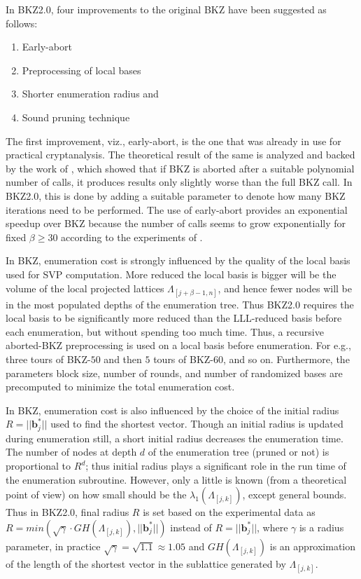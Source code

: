 In BKZ2.0, four improvements to the original BKZ have been suggested as follows:
\begin{enumerate}
    \item Early-abort
    \item Preprocessing of local bases
    \item Shorter enumeration radius and
    \item Sound pruning technique
\end{enumerate}

The first improvement, viz., early-abort, is the one that was already in use for practical cryptanalysis.
The theoretical result of the same is analyzed and backed by the work of \cite{hanrot2011analyzing}, which showed that if BKZ is aborted after a suitable polynomial number of calls, it produces results only slightly worse than the full BKZ call.
In BKZ2.0, this is done by adding a suitable parameter to denote how many BKZ iterations need to be performed.
The use of early-abort provides an exponential speedup over BKZ because the number of calls seems to grow exponentially for fixed $\beta \geq 30$ according to the experiments of \cite{gama2008predicting}.

In BKZ, enumeration cost is strongly inﬂuenced by the quality of the local basis used for SVP computation.
More reduced the local basis is bigger will be the volume of the local projected lattices $\Lambda_{[j+\beta-1,n]}$, and hence fewer nodes will be in the most populated depths of the enumeration tree.
Thus BKZ2.0 requires the local basis to be significantly more reduced than the LLL-reduced basis before each enumeration, but without spending too much time.
Thus, a recursive aborted-BKZ preprocessing is used on a local basis before enumeration.
For e.g., three tours of BKZ-$50$ and then $5$ tours of BKZ-$60$, and so on.
Furthermore, the parameters block size, number of rounds, and number of randomized bases are precomputed to minimize the total enumeration cost.


In BKZ, enumeration cost is also inﬂuenced by the choice of the initial radius $R=||\pmb{b}^*_j||$ used to find the shortest vector.
Though an initial radius is updated during enumeration still, a short initial radius decreases the enumeration time.
The number of nodes at depth $d$ of the enumeration tree (pruned or not) is proportional to $R^d$; thus initial radius plays a significant role in the run time of the enumeration subroutine.
However, only a little is known (from a theoretical point of view) on how small should be the $\lambda_1(\Lambda_{[j,k]})$, except general bounds.
Thus in BKZ2.0, final radius $R$ is set based on the experimental data as $R=min(\sqrt{\gamma} \cdot GH(\Lambda_{[j,k]}),||\pmb{b}_j^*||)$ instead of $R=||\pmb{b}_j^*||$, where $\gamma$ is a radius parameter, in practice $\sqrt{\gamma}=\sqrt{1.1} \approx 1.05$ and $GH(\Lambda_{[j,k]})$ is an approximation of the length of the shortest vector in the sublattice generated by $\Lambda_{[j,k]}$.

